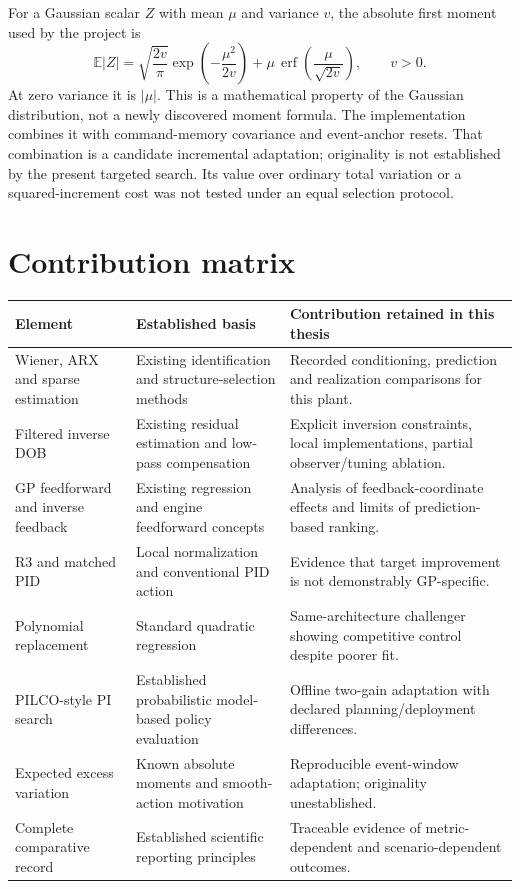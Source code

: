 For a Gaussian scalar $Z$ with mean $\mu$ and variance $v$, the absolute first moment used by the project is
\begin{equation}
\mathbb E|Z|=\sqrt{\frac{2v}{\pi}}\exp\!\left(-\frac{\mu^2}{2v}\right)+\mu\,\operatorname{erf}\!\left(\frac{\mu}{\sqrt{2v}}\right),\qquad v>0.
\end{equation}
At zero variance it is $|\mu|$. This is a mathematical property of the Gaussian distribution, not a newly discovered moment formula. The implementation combines it with command-memory covariance and event-anchor resets. That combination is a candidate incremental adaptation; originality is not established by the present targeted search. Its value over ordinary total variation or a squared-increment cost was not tested under an equal selection protocol.

\section{Contribution matrix}
\begin{longtable}{@{}p{.22\linewidth}p{.31\linewidth}p{.40\linewidth}@{}}
\toprule Element & Established basis & Contribution retained in this thesis\\\midrule\endhead
Wiener, ARX and sparse estimation & Existing identification and structure-selection methods & Recorded conditioning, prediction and realization comparisons for this plant.\\
Filtered inverse DOB & Existing residual estimation and low-pass compensation & Explicit inversion constraints, local implementations, partial observer/tuning ablation.\\
GP feedforward and inverse feedback & Existing regression and engine feedforward concepts & Analysis of feedback-coordinate effects and limits of prediction-based ranking.\\
R3 and matched PID & Local normalization and conventional PID action & Evidence that target improvement is not demonstrably GP-specific.\\
Polynomial replacement & Standard quadratic regression & Same-architecture challenger showing competitive control despite poorer fit.\\
PILCO-style PI search & Established probabilistic model-based policy evaluation & Offline two-gain adaptation with declared planning/deployment differences.\\
Expected excess variation & Known absolute moments and smooth-action motivation & Reproducible event-window adaptation; originality unestablished.\\
Complete comparative record & Established scientific reporting principles & Traceable evidence of metric-dependent and scenario-dependent outcomes.\\\bottomrule
\end{longtable}

